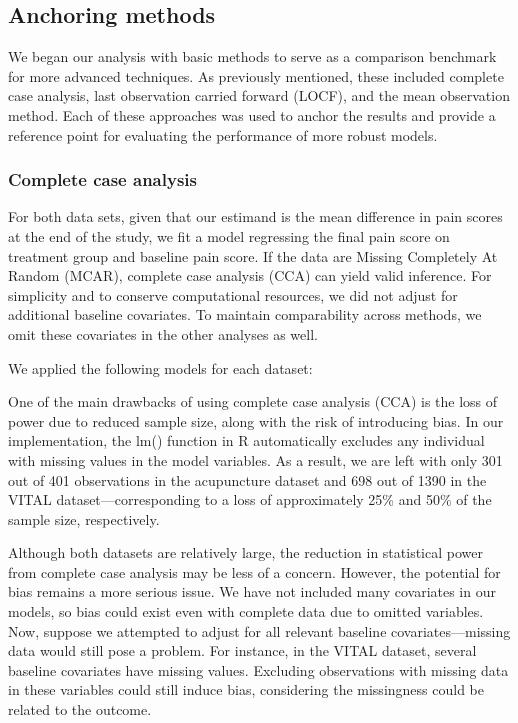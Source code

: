\documentclass{article}
\begin{document}
\subsection{Anchoring methods}\label{anchoring-methods}

We began our analysis with basic methods to serve as a comparison
benchmark for more advanced techniques. As previously mentioned, these
included complete case analysis, last observation carried forward
(LOCF), and the mean observation method. Each of these approaches was
used to anchor the results and provide a reference point for evaluating
the performance of more robust models.

\subsubsection{Complete case analysis}\label{complete-case-analysis}

For both data sets, given that our estimand is the mean difference in
pain scores at the end of the study, we fit a model regressing the final
pain score on treatment group and baseline pain score. If the data are
Missing Completely At Random (MCAR), complete case analysis (CCA) can
yield valid inference. For simplicity and to conserve computational
resources, we did not adjust for additional baseline covariates. To
maintain comparability across methods, we omit these covariates in the
other analyses as well.

We applied the following models for each dataset:

One of the main drawbacks of using complete case analysis (CCA) is the
loss of power due to reduced sample size, along with the risk of
introducing bias. In our implementation, the lm() function in R
automatically excludes any individual with missing values in the model
variables. As a result, we are left with only 301 out of 401
observations in the acupuncture dataset and 698 out of 1390 in the VITAL
dataset---corresponding to a loss of approximately 25\% and 50\% of the
sample size, respectively.

Although both datasets are relatively large, the reduction in
statistical power from complete case analysis may be less of a concern.
However, the potential for bias remains a more serious issue. We have
not included many covariates in our models, so bias could exist even
with complete data due to omitted variables. Now, suppose we attempted
to adjust for all relevant baseline covariates---missing data would
still pose a problem. For instance, in the VITAL dataset, several
baseline covariates have missing values. Excluding observations with
missing data in these variables could still induce bias, considering the
missingness could be related to the outcome.
\end{document}
